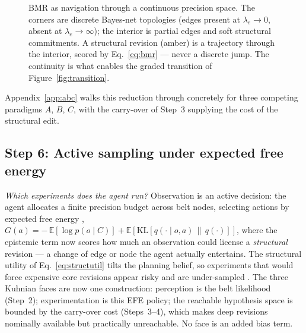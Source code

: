 \begin{figure}[t]
\vspace{1.4cm}
\caption{BMR as navigation through a continuous precision space. The
corners are discrete Bayes-net topologies (edges present at
$\lambda_e\!\to\!0$, absent at $\lambda_e\!\to\!\infty$); the interior is
partial edges and soft structural commitments. A structural revision
(amber) is a trajectory through the interior, scored by
Eq.~\eqref{eq:bmr} --- never a discrete jump. The continuity is what
enables the graded transition of Figure~\ref{fig:transition}.}
\label{fig:bmr}
\end{figure}

\noindent Appendix~\ref{app:abc} walks this reduction through concretely
for three competing paradigms $A$, $B$, $C$, with the carry-over of
Step~3 supplying the cost of the structural edit.

\subsection{Step 6: Active sampling under expected free energy}
\label{ssec:efe}

\noindent\textit{Which experiments does the agent run?} Observation is
an active decision: the agent allocates a finite precision budget across
belt nodes, selecting actions by expected free energy
\citep{friston2015ActiveInferenceEpistemic, millidge2021EFE, Mirza2019_2},
$G(a) = -\,\mathbb{E}[\log p(o \mid C)] + \mathbb{E}[\mathrm{KL}[q(\cdot
\mid o, a)\,\|\,q(\cdot)]]$, where the epistemic term now scores how much
an observation could license a \emph{structural} revision --- a change
of edge or node the agent actually entertains. The structural utility of
Eq.~\eqref{eq:structutil} tilts the planning belief, so experiments that
would force expensive core revisions appear risky and are under-sampled
\citep{feldmanFriston2010Attention, parrFriston2017Attention,
parrFriston2019AdvancedAtt, limanowskiFriston2018Dark}. The three
Kuhnian faces are now one construction: perception is the belt
likelihood (Step~2); experimentation is this EFE policy; the reachable
hypothesis space is bounded by the carry-over cost (Steps~3--4), which
makes deep revisions nominally available but practically unreachable. No
face is an added bias term.

